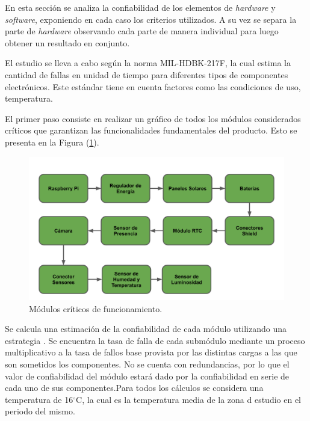 %

%
En esta sección se analiza la confiabilidad de los elementos de \textit{hardware} y \textit{software}, exponiendo en cada caso los criterios utilizados. A su vez se separa la parte de \textit{hardware} observando cada parte de manera individual para luego obtener un resultado en conjunto.

El estudio se lleva a cabo según la norma MIL-HDBK-217F, la cual estima la cantidad de fallas en unidad de tiempo para diferentes tipos de componentes electrónicos. Este estándar tiene en cuenta factores como las condiciones de uso, temperatura.

El primer paso consiste en realizar un gráfico de todos los módulos considerados críticos que garantizan las funcionalidades fundamentales del producto. Esto se presenta en la Figura (\ref{fig:criticos}).
\begin{figure}[H]
	\centering
	\includegraphics[width=0.9\linewidth,page=1]{ImagenesEstudios/ModulosCriticos}		
	\caption{Módulos críticos de funcionamiento.}
	\label{fig:criticos}
\end{figure}
Se calcula una estimación de la confiabilidad de cada módulo utilizando una estrategia . Se encuentra la tasa de falla de cada submódulo mediante un proceso multiplicativo a la tasa de fallos base provista por las distintas cargas a las que son sometidos los componentes.
No se cuenta con redundancias, por lo que el valor de confiabilidad del módulo estará dado por la confiabilidad en serie de cada uno de sus componentes.Para todos los cálculos se considera una temperatura de 16$^{\circ}$C, la cual es la temperatura media de la zona d estudio en el periodo del mismo.

